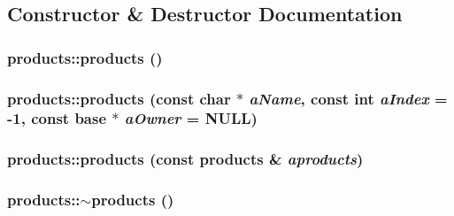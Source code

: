 \subsection{Constructor \& Destructor Documentation}
\hypertarget{classproducts_a7d8600c3aa1b8a5e03e3e75b44fe9969}{
\subsubsection[{products}]{\setlength{\rightskip}{0pt plus 5cm}products::products ()}}
\label{classproducts_a7d8600c3aa1b8a5e03e3e75b44fe9969}
\hypertarget{classproducts_a2f166f5fe4998ec698692c5debaecc5a}{
\subsubsection[{products}]{\setlength{\rightskip}{0pt plus 5cm}products::products (const char $\ast$ {\em aName}, \/  const int {\em aIndex} = {\ttfamily -\/1}, \/  const {\bf base} $\ast$ {\em aOwner} = {\ttfamily NULL})}}
\label{classproducts_a2f166f5fe4998ec698692c5debaecc5a}
\hypertarget{classproducts_a645a76ba77506cb12a782ea5acefffa3}{
\subsubsection[{products}]{\setlength{\rightskip}{0pt plus 5cm}products::products (const {\bf products} \& {\em aproducts})}}
\label{classproducts_a645a76ba77506cb12a782ea5acefffa3}
\hypertarget{classproducts_a5591d80f0a425a5da2bbd6e7ffa663f7}{
\subsubsection[{$\sim$products}]{\setlength{\rightskip}{0pt plus 5cm}products::$\sim$products ()}}
\label{classproducts_a5591d80f0a425a5da2bbd6e7ffa663f7}


